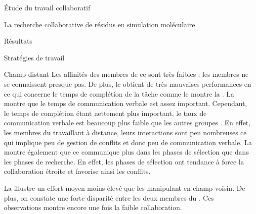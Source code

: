 \documentclass[myfrancais]{mythesis}
\begin{document}
\begin{mypart}{Étude du travail collaboratif}
\begin{mychapter}{La recherche collaborative de résidus en simulation moléculaire}
\begin{mysection}{Résultats}
\begin{mysubsection}{Stratégies de travail}
\begin{mysubsubsection}{Champ distant}
						Les affinités des membres de ce  sont très faibles  : les membres ne se connaissent presque pas.
						De plus, le  obtient de très mauvaises performances en ce qui concerne le temps de complétion de la tâche comme le montre la .
						La  montre que le temps de communication verbale est assez important.
						Cependant, le temps de complétion étant nettement plus important, le taux de communication verbale est beaucoup plus faible que les autres groupes .
						En effet, les membres du  travaillant à distance, leurs interactions sont peu nombreuses ce qui implique peu de gestion de conflits et donc peu de communication verbale.
						La  montre également que ce  communique plus dans les phases de sélection que dans les phases de recherche.
						En effet, les phases de sélection ont tendance à force la collaboration étroite et favorise ainsi les conflits.

						La  illustre un effort moyen moins élevé que les  manipulant en champ voisin.
						De plus, on constate une forte disparité entre les deux membres du .
						Ces observations montre encore une fois la faible collaboration.


\end{mysubsubsection}
\end{mysubsection}
\end{mysection}
\end{mychapter}
\end{mypart}
\end{document}
